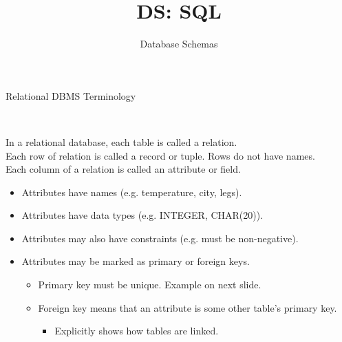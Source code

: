 \documentclass[aspectratio=169]{../latex_main/tntbeamer}  %
\title[Introduction]{DS: SQL}
\subtitle{Database Schemas}
\begin{document}
	
	\maketitle
	\begin{frame}{Relational DBMS Terminology}
	    
	    \begin{columns}
	        \begin{column}{.75\textwidth}
	        \vspace{.4cm}\\
	        In a relational database, each table is called a relation.\\
            Each row of relation is called a record or tuple. Rows do not have names.\\
            Each column of a relation is called an attribute or field.

	                \begin{itemize}
	                    \item Attributes have names (e.g. temperature, city, legs).
	                    \item Attributes have data types (e.g. INTEGER, CHAR(20)).
	                    \item Attributes may also have constraints (e.g. must be non-negative).
	                    \item Attributes may be marked as primary or foreign keys.
	                    \begin{itemize}
	                        \item Primary key must be unique. Example on next slide.
	                        \item Foreign key means that an attribute is some other table’s primary key.
	                        \begin{itemize}
	                            \item Explicitly shows how tables are linked.
	                        \end{itemize}
	                    \end{itemize}
	                \end{itemize}
	        \end{column}
	        
	        
	        

\end{columns}
\end{frame}
\end{document}
